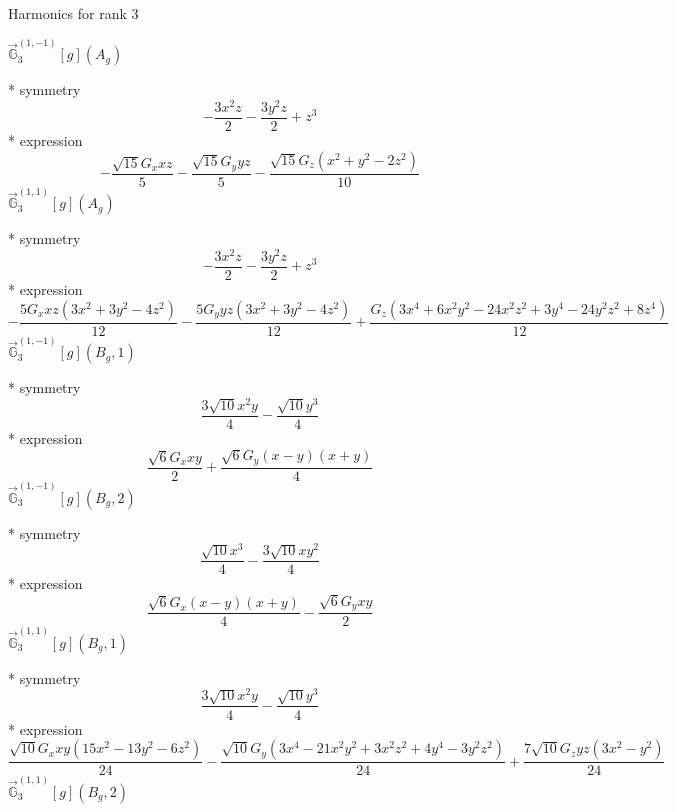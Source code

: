 \documentclass[fleqn,8pt]{jsarticle}
\begin{document}
\noindent * Harmonics for rank 3

\noindent\quad $\vec{\mathbb{G}}_{3}^{(1,-1)}[g](A_{g})$

\noindent\quad ** symmetry
\begin{dmath*}
- \frac{3 x^{2} z}{2} - \frac{3 y^{2} z}{2} + z^{3}
\end{dmath*}
\noindent\quad ** expression
\begin{dmath*}
- \frac{\sqrt{15} G_{x} x z}{5} - \frac{\sqrt{15} G_{y} y z}{5} - \frac{\sqrt{15} G_{z} \left(x^{2} + y^{2} - 2 z^{2}\right)}{10}
\end{dmath*}
\noindent\quad $\vec{\mathbb{G}}_{3}^{(1,1)}[g](A_{g})$

\noindent\quad ** symmetry
\begin{dmath*}
- \frac{3 x^{2} z}{2} - \frac{3 y^{2} z}{2} + z^{3}
\end{dmath*}
\noindent\quad ** expression
\begin{dmath*}
- \frac{5 G_{x} x z \left(3 x^{2} + 3 y^{2} - 4 z^{2}\right)}{12} - \frac{5 G_{y} y z \left(3 x^{2} + 3 y^{2} - 4 z^{2}\right)}{12} + \frac{G_{z} \left(3 x^{4} + 6 x^{2} y^{2} - 24 x^{2} z^{2} + 3 y^{4} - 24 y^{2} z^{2} + 8 z^{4}\right)}{12}
\end{dmath*}
\noindent\quad $\vec{\mathbb{G}}_{3}^{(1,-1)}[g](B_{g},1)$

\noindent\quad ** symmetry
\begin{dmath*}
\frac{3 \sqrt{10} x^{2} y}{4} - \frac{\sqrt{10} y^{3}}{4}
\end{dmath*}
\noindent\quad ** expression
\begin{dmath*}
\frac{\sqrt{6} G_{x} x y}{2} + \frac{\sqrt{6} G_{y} \left(x - y\right) \left(x + y\right)}{4}
\end{dmath*}
\noindent\quad $\vec{\mathbb{G}}_{3}^{(1,-1)}[g](B_{g},2)$

\noindent\quad ** symmetry
\begin{dmath*}
\frac{\sqrt{10} x^{3}}{4} - \frac{3 \sqrt{10} x y^{2}}{4}
\end{dmath*}
\noindent\quad ** expression
\begin{dmath*}
\frac{\sqrt{6} G_{x} \left(x - y\right) \left(x + y\right)}{4} - \frac{\sqrt{6} G_{y} x y}{2}
\end{dmath*}
\noindent\quad $\vec{\mathbb{G}}_{3}^{(1,1)}[g](B_{g},1)$

\noindent\quad ** symmetry
\begin{dmath*}
\frac{3 \sqrt{10} x^{2} y}{4} - \frac{\sqrt{10} y^{3}}{4}
\end{dmath*}
\noindent\quad ** expression
\begin{dmath*}
\frac{\sqrt{10} G_{x} x y \left(15 x^{2} - 13 y^{2} - 6 z^{2}\right)}{24} - \frac{\sqrt{10} G_{y} \left(3 x^{4} - 21 x^{2} y^{2} + 3 x^{2} z^{2} + 4 y^{4} - 3 y^{2} z^{2}\right)}{24} + \frac{7 \sqrt{10} G_{z} y z \left(3 x^{2} - y^{2}\right)}{24}
\end{dmath*}
\noindent\quad $\vec{\mathbb{G}}_{3}^{(1,1)}[g](B_{g},2)$
\end{document}
